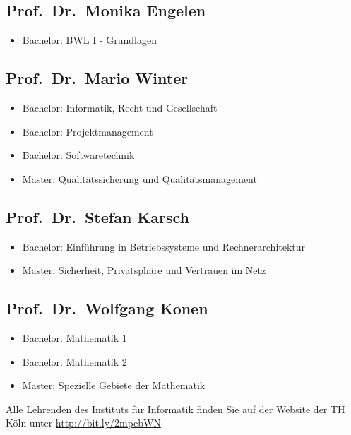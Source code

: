 \subsection{Prof.~Dr.~Monika Engelen}\label{prof.dr.monika-engelen}

\begin{itemize}
\tightlist
\item
  Bachelor: BWL I - Grundlagen
\end{itemize}

\subsection{Prof.~Dr.~Mario Winter}\label{prof.dr.mario-winter}

\begin{itemize}
\tightlist
\item
  Bachelor: Informatik, Recht und Gesellschaft
\item
  Bachelor: Projektmanagement
\item
  Bachelor: Softwaretechnik
\item
  Master: Qualitätssicherung und Qualitätsmanagement
\end{itemize}

\subsection{Prof.~Dr.~Stefan Karsch}\label{prof.dr.stefan-karsch}

\begin{itemize}
\tightlist
\item
  Bachelor: Einführung in Betriebssysteme und Rechnerarchitektur
\item
  Master: Sicherheit, Privatsphäre und Vertrauen im Netz
\end{itemize}

\subsection{Prof.~Dr.~Wolfgang Konen}\label{prof.dr.wolfgang-konen}

\begin{itemize}
\tightlist
\item
  Bachelor: Mathematik 1
\item
  Bachelor: Mathematik 2
\item
  Master: Spezielle Gebiete der Mathematik
\end{itemize}

Alle Lehrenden des Instituts für Informatik finden Sie auf der Website
der TH Köln unter \href{http://bit.ly/2mbFEYc}{http://bit.ly/2mpcbWN}

